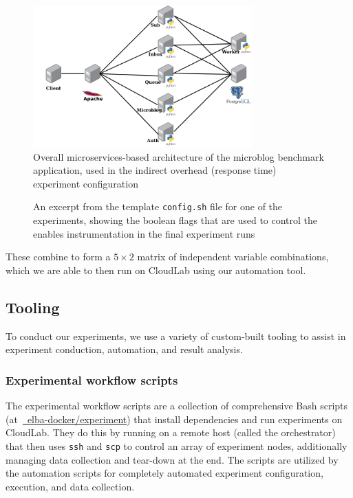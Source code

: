 \documentclass[a4paper,11pt]{article}
\newcommand{\github}[2]{\,\href{https://github.com/#1/#2}{\faGithub~#1/\linebreak[0]#2}\xspace}
\begin{document}
\begin{figure}[H]
    \vspace{0.5em}
    \centering
    \includegraphics[width=0.75\textwidth]{images/microblog.png}
    \vspace{0.75em}
    \caption{
        Overall microservices-based architecture of the microblog benchmark application,
        used in the indirect overhead (response time) experiment configuration
    }
    \vspace{0.2em}
    \label{fig:microblog}
\end{figure}

\begin{figure}[H]
    \caption{
        An excerpt from the template \texttt{config.sh} file for one of the experiments,
        showing the boolean flags that are used to control the enables instrumentation
        in the final experiment runs
    }
    \label{fig:config_instrumentation}
\end{figure}

These combine to form a $5\times 2$ matrix of independent variable combinations,
which we are able to then run on CloudLab using our automation tool.

\subsection{Tooling}

To conduct our experiments, we use a variety of custom-built tooling
to assist in experiment conduction, automation, and result analysis.

\subsubsection{Experimental workflow scripts}

The experimental workflow scripts are a collection of comprehensive Bash scripts
(at \github{elba-docker}{experiment})
that install dependencies and run experiments on CloudLab.
They do this by running on a remote host (called the orchestrator)
that then uses \texttt{ssh} and \texttt{scp} to control an array of experiment nodes,
additionally managing data collection and tear-down at the end.
The scripts are utilized by the automation scripts
for completely automated experiment configuration, execution, and data collection. 
\end{document}
